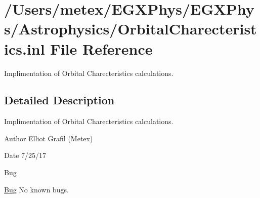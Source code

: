 \hypertarget{_orbital_charecteristics_8inl}{}\section{/\+Users/metex/\+E\+G\+X\+Phys/\+E\+G\+X\+Phys/\+Astrophysics/\+Orbital\+Charecteristics.inl File Reference}
\label{_orbital_charecteristics_8inl}


Implimentation of Orbital Charecteristics calculations.  




\subsection{Detailed Description}
Implimentation of Orbital Charecteristics calculations. 

\begin{DoxyAuthor}{Author}
Elliot Grafil (Metex) 
\end{DoxyAuthor}
\begin{DoxyDate}{Date}
7/25/17 
\end{DoxyDate}
\begin{DoxyRefDesc}{Bug}
\item[\hyperlink{bug__bug000014}{Bug}]No known bugs. \end{DoxyRefDesc}
